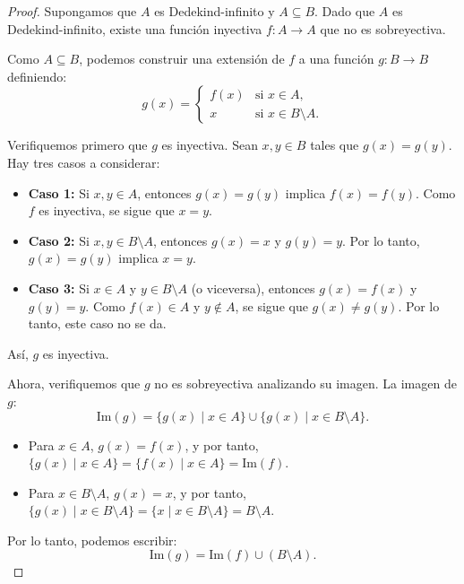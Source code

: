 \documentclass[a4,10pt]{aleph-notas}
\begin{document}
\begin{proof}
    Supongamos que \( A \) es Dedekind-infinito y \( A \subseteq B \). Dado que \( A \) es Dedekind-infinito, existe una función inyectiva \( f: A \to A \) que no es sobreyectiva.

    Como \( A \subseteq B \), podemos construir una extensión de \( f \) a una función \( g: B \to B \) definiendo:
    \[
    g(x) =
    \begin{cases} 
    f(x) & \text{si } x \in A, \\
    x & \text{si } x \in B \setminus A.
    \end{cases}
    \]

    Verifiquemos primero que \( g \) es inyectiva. Sean \( x, y \in B \) tales que \( g(x) = g(y) \). Hay tres casos a considerar:
    \begin{itemize}
        \item \textbf{Caso 1:} Si \( x, y \in A \), entonces \( g(x) = g(y) \) implica \( f(x) = f(y) \). Como \( f \) es inyectiva, se sigue que \( x = y \).
        
        \item \textbf{Caso 2:} Si \( x, y \in B \setminus A \), entonces \( g(x) = x \) y \( g(y) = y \). Por lo tanto, \( g(x) = g(y) \) implica \( x = y \).
        
        \item \textbf{Caso 3:} Si \( x \in A \) y \( y \in B \setminus A \) (o viceversa), entonces \( g(x) = f(x) \) y \( g(y) = y \). Como \( f(x) \in A \) y \( y \notin A \), se sigue que \( g(x) \neq g(y) \). Por lo tanto, este caso no se da.
    \end{itemize}
    Así, \( g \) es inyectiva.

    Ahora, verifiquemos que \( g \) no es sobreyectiva analizando su imagen. La imagen de \( g \):
    \[
    \text{Im}(g) = \{ g(x) \mid x \in A \} \cup \{ g(x) \mid x \in B \setminus A \}.
    \]

    \begin{itemize}
        \item Para \( x \in A \), \( g(x) = f(x) \), y por tanto, \( \{ g(x) \mid x \in A \} = \{ f(x) \mid x \in A \} =\text{Im}(f) \).
        \item Para \( x \in B \setminus A \), \( g(x) = x \), y por tanto, \( \{ g(x) \mid x \in B \setminus A \} = \{ x \mid x \in B \setminus A \} = B \setminus A \).
    \end{itemize}

    Por lo tanto, podemos escribir:
    \[
    \text{Im}(g) = \text{Im}(f) \cup (B \setminus A).
    \]


\end{proof}
\end{document}
